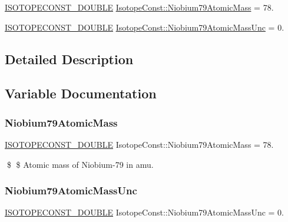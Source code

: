 \begin{DoxyCompactItemize}
\item 
\mbox{\hyperlink{group___isotope_const-_macros_ga8f45a7272ce02c0b4c65c44636ed719a}{I\+S\+O\+T\+O\+P\+E\+C\+O\+N\+S\+T\+\_\+\+D\+O\+U\+B\+LE}} \mbox{\hyperlink{group___isotope_const-_niobium-_nb79_gad5932f330495b6ae5d8ad0a9e2fcc3af}{Isotope\+Const\+::\+Niobium79\+Atomic\+Mass}} = 78.
\item 
\mbox{\hyperlink{group___isotope_const-_macros_ga8f45a7272ce02c0b4c65c44636ed719a}{I\+S\+O\+T\+O\+P\+E\+C\+O\+N\+S\+T\+\_\+\+D\+O\+U\+B\+LE}} \mbox{\hyperlink{group___isotope_const-_niobium-_nb79_ga9086123f2e96467e81539373ad32a3e9}{Isotope\+Const\+::\+Niobium79\+Atomic\+Mass\+Unc}} = 0.
\end{DoxyCompactItemize}


\subsection{Detailed Description}


\subsection{Variable Documentation}
\mbox{\label{group___isotope_const-_niobium-_nb79_gad5932f330495b6ae5d8ad0a9e2fcc3af}} 
\subsubsection{\texorpdfstring{Niobium79\+Atomic\+Mass}{Niobium79AtomicMass}}
{\footnotesize\ttfamily \mbox{\hyperlink{group___isotope_const-_macros_ga8f45a7272ce02c0b4c65c44636ed719a}{I\+S\+O\+T\+O\+P\+E\+C\+O\+N\+S\+T\+\_\+\+D\+O\+U\+B\+LE}} Isotope\+Const\+::\+Niobium79\+Atomic\+Mass = 78.}

\$ \$ Atomic mass of Niobium-\/79 in amu. \mbox{\label{group___isotope_const-_niobium-_nb79_ga9086123f2e96467e81539373ad32a3e9}} 
\subsubsection{\texorpdfstring{Niobium79\+Atomic\+Mass\+Unc}{Niobium79AtomicMassUnc}}
{\footnotesize\ttfamily \mbox{\hyperlink{group___isotope_const-_macros_ga8f45a7272ce02c0b4c65c44636ed719a}{I\+S\+O\+T\+O\+P\+E\+C\+O\+N\+S\+T\+\_\+\+D\+O\+U\+B\+LE}} Isotope\+Const\+::\+Niobium79\+Atomic\+Mass\+Unc = 0.}

